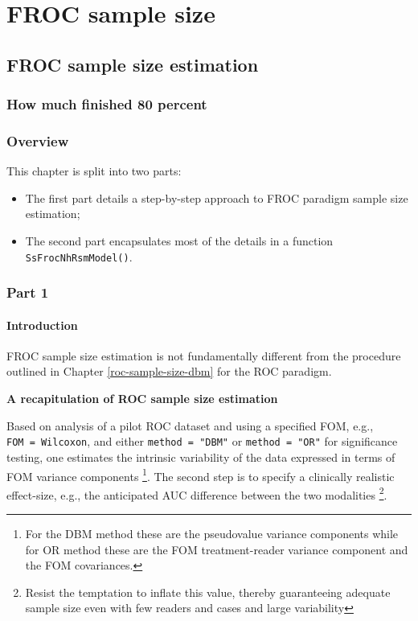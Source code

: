 \documentclass[
]{book}
\begin{document}
\hypertarget{part-froc-sample-size}{%
\part*{FROC sample size}\label{part-froc-sample-size}}

\hypertarget{froc-sample-size}{%
\chapter{FROC sample size estimation}\label{froc-sample-size}}

\hypertarget{froc-sample-size-how-much-finished}{%
\section{How much finished 80 percent}\label{froc-sample-size-how-much-finished}}

\hypertarget{overview}{%
\section{Overview}\label{overview}}

This chapter is split into two parts:

\begin{itemize}
\item
  The first part details a step-by-step approach to FROC paradigm sample size estimation;
\item
  The second part encapsulates most of the details in a function \texttt{SsFrocNhRsmModel()}.
\end{itemize}

\hypertarget{part-1}{%
\section{Part 1}\label{part-1}}

\hypertarget{froc-sample-size-intro}{%
\subsection{Introduction}\label{froc-sample-size-intro}}

FROC sample size estimation is not fundamentally different from the procedure outlined in Chapter \ref{roc-sample-size-dbm} for the ROC paradigm.

\textbf{A recapitulation of ROC sample size estimation}

Based on analysis of a pilot ROC dataset and using a specified FOM, e.g., \texttt{FOM\ =\ Wilcoxon}, and either \texttt{method\ =\ "DBM"} or \texttt{method\ =\ "OR"} for significance testing, one estimates the intrinsic variability of the data expressed in terms of FOM variance components \footnote{For the DBM method these are the pseudovalue variance components while for OR method these are the FOM treatment-reader variance component and the FOM covariances.}. The second step is to specify a clinically realistic effect-size, e.g., the anticipated AUC difference between the two modalities \footnote{Resist the temptation to inflate this value, thereby guaranteeing adequate sample size even with few readers and cases and large variability}.
\end{document}
